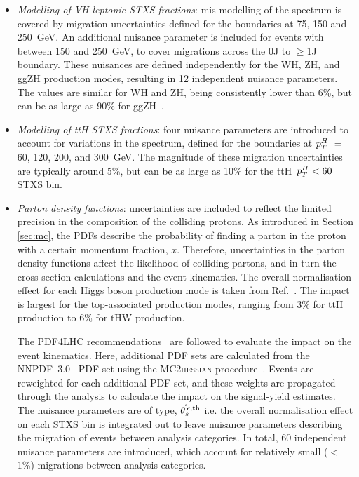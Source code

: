 \begin{itemize}
    \item \textit{Modelling of VH leptonic STXS fractions}: mis-modelling of the \ptV spectrum is covered by migration uncertainties defined for the boundaries at 75, 150 and 250~GeV. An additional nuisance parameter is included for events with \ptV between 150 and 250~GeV, to cover migrations across the 0J to $\geq$1J boundary. These nuisances are defined independently for the WH, ZH, and ggZH production modes, resulting in 12 independent nuisance parameters. The values are similar for WH and ZH, being consistently lower than 6\%, but can be as large as 90\% for ggZH~\cite{ATL-PHYS-PUB-2018-035}. 
    
    \item \textit{Modelling of ttH STXS fractions}: four nuisance parameters are introduced to account for variations in the \ptH spectrum, defined for the boundaries at $p_T^H~=~$60, 120, 200, and 300~GeV. The magnitude of these migration uncertainties are typically around 5\%, but can be as large as 10\% for the ttH~$p_T^H<60$ STXS bin.
    
    \item \textit{Parton density functions}: uncertainties are included to reflect the limited precision in the composition of the colliding protons. As introduced in Section \ref{sec:mc}, the PDFs describe the probability of finding a parton in the proton with a certain momentum fraction, $x$. Therefore, uncertainties in the parton density functions affect the likelihood of colliding partons, and in turn the cross section calculations and the event kinematics. The overall normalisation effect for each Higgs boson production mode is taken from Ref.~\cite{deFlorian:2016spz}. The impact is largest for the top-associated production modes, ranging from 3\% for ttH production to 6\% for tHW production.
    
    \noindent
    The PDF4LHC recommendations~\cite{Ball:2014uwa,Butterworth:2015oua,Dulat:2015mca,Harland-Lang:2014zoa} are followed to evaluate the impact on the event kinematics. Here, additional PDF sets are calculated from the NNPDF~3.0~\cite{Ball:2014uwa} PDF set using the MC2\textsc{hessian} procedure~\cite{Carrazza:2015aoa,Gao:2013bia}. Events are reweighted for each additional PDF set, and these weights are propagated through the analysis to calculate the impact on the signal-yield estimates. The nuisance parameters are of type, $\vec{\theta}^{\,\epsilon,{\rm{th}}}_{s}$ i.e. the overall normalisation effect on each STXS bin is integrated out to leave nuisance parameters describing the migration of events between analysis categories. In total, 60 independent nuisance parameters are introduced, which account for relatively small ($<$1\%) migrations between analysis categories.
    

\end{itemize}

